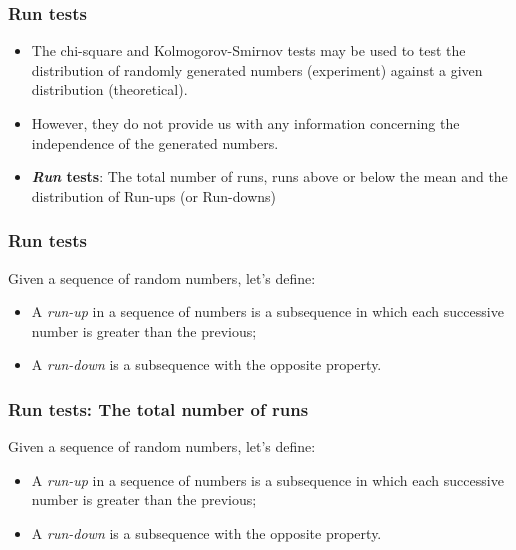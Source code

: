 \begin{frame}
    \frametitle{Run tests}

    \begin{itemize}
        \item The chi-square and Kolmogorov-Smirnov tests may be used to test the distribution
        of randomly generated numbers (experiment) against a given distribution (theoretical).

        \item However, they do not provide us with any information concerning the independence
        of the generated numbers.

        \item \textbf{\textit{Run} tests}: The total number of runs, runs above or below the mean and 
        the distribution of Run-ups (or Run-downs)

    \end{itemize}

\end{frame}




\begin{frame}
    \frametitle{Run tests}
    Given a sequence of random numbers, let's define:

    \begin{itemize}
        \item A \textit{run-up} in a sequence of numbers is a subsequence
        in which each successive number is greater than the previous;

        \item A \textit{run-down} is a subsequence with the opposite property.
    \end{itemize}
\end{frame}



\begin{frame}
    \frametitle{Run tests: The total number of runs}
    Given a sequence of random numbers, let's define:

    \begin{itemize}
        \item A \textit{run-up} in a sequence of numbers is a subsequence
        in which each successive number is greater than the previous;

        \item A \textit{run-down} is a subsequence with the opposite property.
    \end{itemize}
\end{frame}

